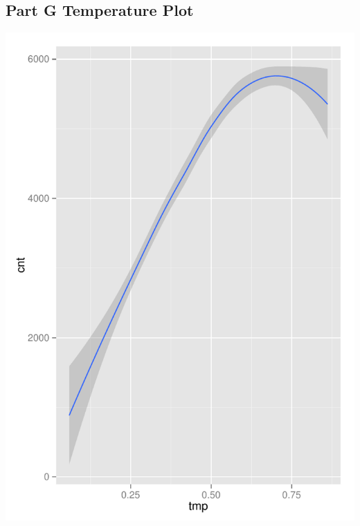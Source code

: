 \documentclass[11pt]{article}
\begin{document}
\subsection{Part G Temperature Plot}
\label{subsec:problem2gplotsTemp}
\includegraphics{Problem2G-Temp.pdf}
\pagebreak
\end{document}
